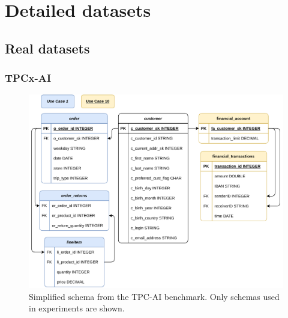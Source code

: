 \chapter{Detailed datasets}


\section{Real datasets}
\subsection{TPCx-AI}

\begin{figure}
    \centering
    \includegraphics[width=0.99\linewidth]{appendices/figures/tpc-ai-schema.pdf}
    \caption{Simplified schema from the TPC-AI \cite{tpcx_ai} benchmark. Only schemas used in experiments are shown.}
    \label{fig:appendix-tpc-ai-schema}
\end{figure}